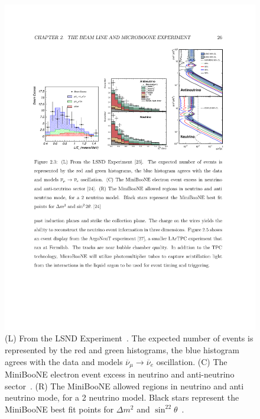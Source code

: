 \documentclass[aps,prd,twocolumn,nofootinbib]{revtex4-1}
\begin{document}
\begin{figure}
  \centering
  \includegraphics[width=1\textwidth]{../figures/lsnd_miniboone.pdf}
  \caption{(L) From the LSND Experiment~\cite{LSND}. The expected number of events is represented by the red and green histograms, the blue histogram agrees with the data and models $\overline{\nu}_{\mu}\rightarrow \overline{\nu}_e$ oscillation. (C) The MiniBooNE electron event excess in neutrino and anti-neutrino sector~\cite{mini2}. (R) The MiniBooNE allowed regions in neutrino and anti neutrino mode, for a 2 neutrino model. Black stars represent the MiniBooNE best fit points for $\Delta m^2$ and $\sin^22\theta$~\cite{mini2}.}
  \label{fig:lsnd_miniboone}
\end{figure}
\end{document}
